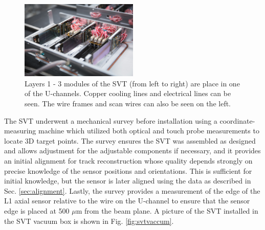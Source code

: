 \begin{figure}
    \centering
    \includegraphics[width=0.5\textwidth]{figs/detector/U1-3.png}
    \caption{Layers 1 - 3 modules of the SVT (from left to right) are place in one of the U-channels. Copper cooling lines and electrical lines can be seen. The wire frames and scan wires can also be seen on the left.}
    \label{fig:uchannel}
\end{figure}

The SVT underwent a mechanical survey before installation using a coordinate-measuring machine which utilized both optical and touch probe measurements to locate 3D target points. The survey ensures the SVT was assembled as designed and allows adjustment for the adjustable components if necessary, and it provides an initial alignment for track reconstruction whose quality depends strongly on precise knowledge of the sensor positions and orientations. This is sufficient for initial knowledge, but the sensor is later aligned using the data as described in Sec. \ref{sec:alignment}. Lastly, the survey provides a measurement of the edge of the L1 axial sensor relative to the wire on the U-channel to ensure that the sensor edge is placed at 500 $\mu$m from the beam plane. A picture of the SVT installed in the SVT vacuum box is shown in Fig. \ref{fig:svtvaccum}.

